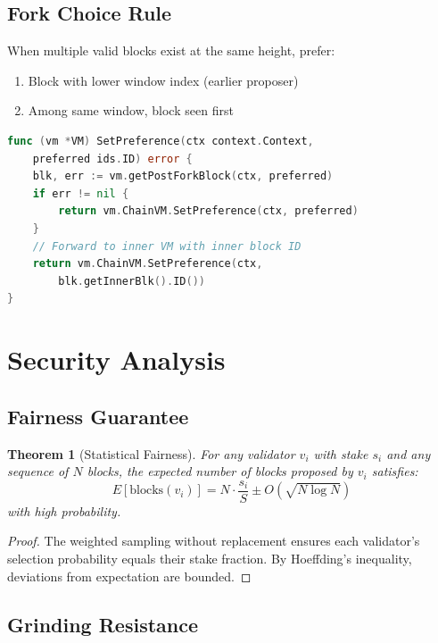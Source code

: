\documentclass[11pt,letterpaper]{article}
\newtheorem{theorem}{Theorem}
\begin{document}
\subsection{Fork Choice Rule}

When multiple valid blocks exist at the same height, prefer:
\begin{enumerate}
    \item Block with lower window index (earlier proposer)
    \item Among same window, block seen first
\end{enumerate}

\begin{lstlisting}[language=Go, caption=Fork Choice]
func (vm *VM) SetPreference(ctx context.Context,
    preferred ids.ID) error {
    blk, err := vm.getPostForkBlock(ctx, preferred)
    if err != nil {
        return vm.ChainVM.SetPreference(ctx, preferred)
    }
    // Forward to inner VM with inner block ID
    return vm.ChainVM.SetPreference(ctx,
        blk.getInnerBlk().ID())
}
\end{lstlisting}

\section{Security Analysis}

\subsection{Fairness Guarantee}

\begin{theorem}[Statistical Fairness]
For any validator $v_i$ with stake $s_i$ and any sequence of $N$ blocks, the expected number of blocks proposed by $v_i$ satisfies:
\begin{equation}
E[\text{blocks}(v_i)] = N \cdot \frac{s_i}{S} \pm O(\sqrt{N \log N})
\end{equation}
with high probability.
\end{theorem}

\begin{proof}
The weighted sampling without replacement ensures each validator's selection probability equals their stake fraction. By Hoeffding's inequality, deviations from expectation are bounded.
\end{proof}

\subsection{Grinding Resistance}
\end{document}

